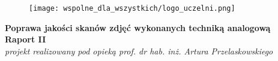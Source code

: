 \documentclass[]{mwart}
\begin{document}
\newpage































































































\part{}
\thispagestyle{empty}

\begin{figure}[h]
    \centering
    \texttt{[image: wspolne\_dla\_wszystkich/logo\_uczelni.png]}
\end{figure}


\begin{center}
    {\LARGE \textbf{Poprawa jakości skanów zdjęć wykonanych techniką analogową
        }} \\[0.3cm]
    {\large \textbf{Raport II}} \\[0.2cm]
    \textit{projekt realizowany pod opieką prof. dr hab. inż. Artura Przelaskowskiego}

\end{center}
\end{document}
